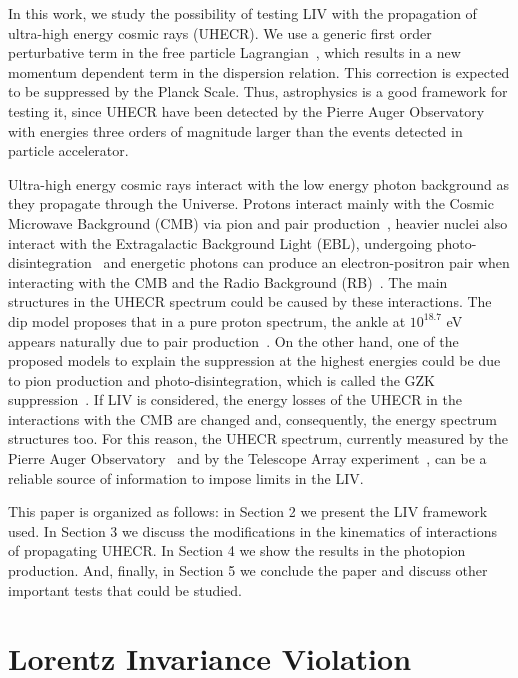 \documentclass[a4paper]{jpconf}
\begin{document}
In this work, we study the possibility of testing LIV with the propagation of ultra-high energy cosmic rays (UHECR). We use a generic first order perturbative term in the free particle Lagrangian~\cite{ColemanGlashow}, which results in a new momentum dependent term in the dispersion relation. This correction is expected to be suppressed by the Planck Scale. Thus, astrophysics is a good framework for testing it, since UHECR have been detected by the Pierre Auger Observatory~\cite{AUGER} with energies three orders of magnitude larger than the events detected in particle accelerator.

Ultra-high energy cosmic rays interact with the low energy photon background as they propagate through the Universe. Protons interact mainly with the Cosmic Microwave Background (CMB) via pion and pair production~\cite{Stecker1968,Blumenthal1970}, heavier nuclei also interact with the Extragalactic Background Light (EBL), undergoing photo-disintegration~\cite{Stecker1999} and energetic photons can produce an electron-positron pair when interacting with the CMB and the Radio Background (RB)~\cite{DeAngelis2013}. The main structures in the UHECR spectrum could be caused by these interactions. The dip model proposes that in a pure proton spectrum, the ankle at $10^{18.7}$ eV appears naturally due to pair production~\cite{Berezinsky2009}. On the other hand, one of the proposed models to explain the suppression at the highest energies could be due to pion production and photo-disintegration, which is called the GZK suppression~\cite{Greisen,ZatsepinKuzmin}. If LIV is considered, the energy losses of the UHECR in the interactions with the CMB are changed and, consequently, the energy spectrum structures too.  For this reason, the UHECR spectrum, currently measured by the Pierre Auger Observatory~\cite{AUGERSpectrum} and by the Telescope Array experiment~\cite{SpectrumTA}, can be a reliable source of information to impose limits in the LIV.


This paper is organized as follows: in Section 2 we present the LIV framework used. In Section 3 we discuss the modifications in the kinematics of interactions of propagating UHECR. In Section 4 we show the results in the photopion production. And, finally, in Section 5 we conclude the paper and discuss other important tests that could be studied.

\section{Lorentz Invariance Violation}
\end{document}
